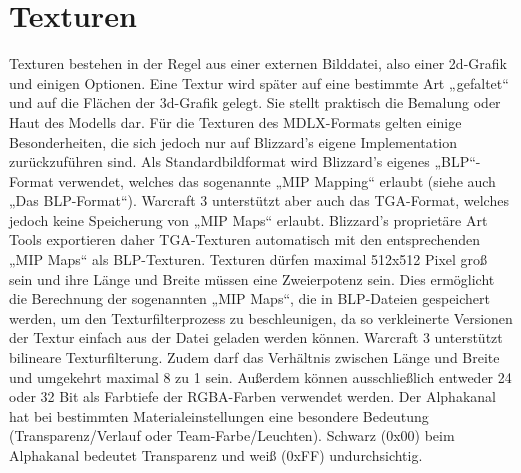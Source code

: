 \chapter{Texturen}
Texturen bestehen in der Regel aus einer externen Bilddatei, also einer 2d-Grafik und einigen Optionen. Eine Textur wird später auf eine bestimmte Art „gefaltet“ und auf die Flächen der 3d-Grafik gelegt. Sie stellt praktisch die Bemalung oder Haut des Modells dar.
Für die Texturen des MDLX-Formats gelten einige Besonderheiten, die sich jedoch nur auf  Blizzard's eigene Implementation zurückzuführen sind. Als Standardbildformat wird Blizzard's eigenes „BLP“-Format verwendet, welches das sogenannte „MIP Mapping“ erlaubt (siehe auch „Das BLP-Format“).
Warcraft 3 unterstützt aber auch das TGA-Format, welches jedoch keine Speicherung von „MIP Maps“ erlaubt.
Blizzard's proprietäre Art Tools exportieren daher TGA-Texturen automatisch mit den entsprechenden „MIP Maps“ als BLP-Texturen.
Texturen dürfen maximal 512x512 Pixel groß sein und ihre Länge und Breite müssen eine Zweierpotenz sein.
Dies ermöglicht die Berechnung der sogenannten „MIP Maps“, die in BLP-Dateien gespeichert werden, um den Texturfilterprozess
zu beschleunigen, da so verkleinerte Versionen der Textur einfach aus der Datei geladen werden können.
Warcraft 3 unterstützt bilineare Texturfilterung.
Zudem darf das Verhältnis zwischen Länge und Breite und umgekehrt maximal 8 zu 1 sein.
Außerdem können ausschließlich entweder 24 oder 32 Bit als Farbtiefe der RGBA-Farben verwendet werden.
Der Alphakanal hat bei bestimmten Materialeinstellungen eine besondere Bedeutung (Transparenz/Verlauf oder Team-Farbe/Leuchten).
Schwarz (0x00) beim Alphakanal bedeutet Transparenz und weiß (0xFF) undurchsichtig.
